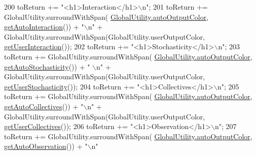\begin{DoxyCode}
200             toReturn += \textcolor{stringliteral}{"<h1>Interaction</h1>\(\backslash\)n"};
201             toReturn += GlobalUtility.surroundWithSpan(
      \hyperlink{classit_1_1isislab_1_1masonhelperdocumentation_1_1analizer_1_1_global_utility_a42aa676ad1ff27c42cd4aab651ff2a35}{GlobalUtility.autoOutputColor}, \hyperlink{classit_1_1isislab_1_1masonhelperdocumentation_1_1_o_d_d_1_1_design_concepts_a6183ce175da9ce0699a41ffad622572c}{getAutoInteraction}()) + \textcolor{stringliteral}{"\(\backslash\)n"} 
      + GlobalUtility.surroundWithSpan(GlobalUtility.userOutputColor, 
      \hyperlink{classit_1_1isislab_1_1masonhelperdocumentation_1_1_o_d_d_1_1_design_concepts_ae6d05ed191abb4725c7a5a7dc2d7449c}{getUserInteraction}());
202             toReturn += \textcolor{stringliteral}{"<h1>Stochasticity</h1>\(\backslash\)n"};
203             toReturn += GlobalUtility.surroundWithSpan(
      \hyperlink{classit_1_1isislab_1_1masonhelperdocumentation_1_1analizer_1_1_global_utility_a42aa676ad1ff27c42cd4aab651ff2a35}{GlobalUtility.autoOutputColor}, \hyperlink{classit_1_1isislab_1_1masonhelperdocumentation_1_1_o_d_d_1_1_design_concepts_a458e86699233a64459741e8f08961344}{getAutoStochasticity}()) + \textcolor{stringliteral}{"
      \(\backslash\)n"} + GlobalUtility.surroundWithSpan(GlobalUtility.userOutputColor, 
      \hyperlink{classit_1_1isislab_1_1masonhelperdocumentation_1_1_o_d_d_1_1_design_concepts_ae4f7c2e729ebe125b5a9d8e92e1d2397}{getUserStochasticity}());
204             toReturn += \textcolor{stringliteral}{"<h1>Collectives</h1>\(\backslash\)n"};
205             toReturn += GlobalUtility.surroundWithSpan(
      \hyperlink{classit_1_1isislab_1_1masonhelperdocumentation_1_1analizer_1_1_global_utility_a42aa676ad1ff27c42cd4aab651ff2a35}{GlobalUtility.autoOutputColor}, \hyperlink{classit_1_1isislab_1_1masonhelperdocumentation_1_1_o_d_d_1_1_design_concepts_a395311bdeaafed43497008c8cf540593}{getAutoCollectives}()) + \textcolor{stringliteral}{"\(\backslash\)n"} 
      + GlobalUtility.surroundWithSpan(GlobalUtility.userOutputColor, 
      \hyperlink{classit_1_1isislab_1_1masonhelperdocumentation_1_1_o_d_d_1_1_design_concepts_a32bbb6b2b23e83b77cf1e629711e440f}{getUserCollectives}());
206             toReturn += \textcolor{stringliteral}{"<h1>Observation</h1>\(\backslash\)n"};
207             toReturn += GlobalUtility.surroundWithSpan(
      \hyperlink{classit_1_1isislab_1_1masonhelperdocumentation_1_1analizer_1_1_global_utility_a42aa676ad1ff27c42cd4aab651ff2a35}{GlobalUtility.autoOutputColor}, \hyperlink{classit_1_1isislab_1_1masonhelperdocumentation_1_1_o_d_d_1_1_design_concepts_a8ad442e14c22ca8b344947c66cc24a9b}{getAutoObservation}()) + \textcolor{stringliteral}{"\(\backslash\)n"} 

\end{DoxyCode}
